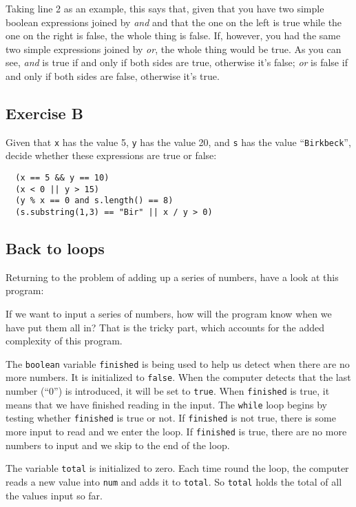 Taking line 2 as an example, this says that, given that you have two simple
boolean expressions joined by \emph{and} and that the one on the left is
true while the one on the right is false, the whole thing is false.  If,
however, you had the same two simple expressions joined by \emph{or}, the
whole thing would be true. As you can see, \emph{and} is true if and
only if both sides are true, otherwise it's false; \emph{or} is false
if and only if both sides are false, otherwise it's true.

\subsection*{Exercise B}

Given that \texttt{x} has the value 5, \texttt{y} has the value 20,
and \texttt{s} has the value ``\texttt{Birkbeck}'', decide whether these
expressions are true or false:

\begin{verbatim}
  (x == 5 && y == 10)
  (x < 0 || y > 15)
  (y % x == 0 and s.length() == 8)
  (s.substring(1,3) == "Bir" || x / y > 0)
\end{verbatim}

\subsection{Back to loops}

Returning to the problem of adding up a series of numbers, have a
look at this program:


If we want to input a series of numbers, how will the program know
when we have put them all in?  That is the tricky part, which accounts
for the added complexity of this program.

The \texttt{boolean} variable
\texttt{finished} is being used to help us detect when there are no more
numbers. It is initialized to \texttt{false}.  When the computer detects
that the last number (``0'') is introduced, it will be set to \texttt{true}.
When \texttt{finished} is true, it means that we have finished reading in
the input. The \texttt{while} loop begins by testing whether \texttt{finished}
is true or not.  If \texttt{finished} is not true, there is some more input
to read and we enter the loop. If \texttt{finished} is true, there are
no more numbers to input and we skip to the end of the loop.

The variable \texttt{total} is initialized to zero.
Each time round the loop, the computer reads a new value into \texttt{num}
and adds it to \texttt{total}. So \texttt{total} holds the total of all
the values input so far.

